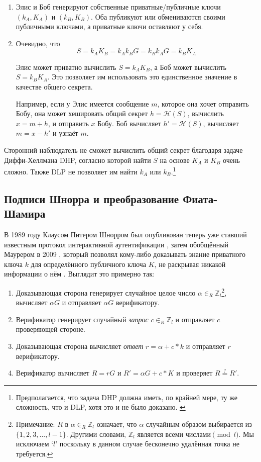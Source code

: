 \begin{enumerate}
	\item Элис и Боб генерируют собственные приватные/публичные ключи \((k_A, K_A) \textrm{ и } (k_B, K_B)\). Оба публикуют или обмениваются своими публичными ключами, а приватные ключи оставляют у себя.

	\item Очевидно, что \[S = k_A K_B = k_A k_B G = k_B k_A G = k_B K_A\]

	Элис может приватно вычислить \(S = k_A K_B\), а Боб может вычислить \(S = k_B K_A\). Это позволяет им использовать это единственное значение в качестве общего секрета.

	Например, если у Элис имеется сообщение $m$, которое она хочет отправить Бобу, она может хешировать общий секрет \(h = \mathcal{H}(S)\), вычислить $x = m + h$, и отправить  $x$ Бобу. Боб вычисляет $h' = \mathcal{H}(S)$, вычисляет $m = x - h'$ и узнаёт $m$.
\end{enumerate}   

Сторонний наблюдатель не сможет вычислить общий секрет благодаря задаче Диффи-Хел\-лмана DHP, согласно которой найти $S$ на основе $K_A$ и $K_B$ очень сложно. Также DLP не позволяет им найти $k_A$ или $k_B$.\footnote{Предполагается, что задача DHP должна иметь, по крайней мере, ту же сложность, что и DLP, хотя это и не было доказано. \cite{diffie-hellman-problem}}


\subsection{Подписи Шнорра и преобразование Фиата-Шамира}
\label{sec:schnorr-fiat-shamir}

В 1989 году Клаусом Питером Шнорром был опубликован теперь уже ставший известным протокол интерактивной аутентификации \cite{schnorr-signatures}, затем обобщённый Маурером в 2009 \cite{simple-zk-proof-maurer}, который позволял кому-либо доказывать знание приватного ключа $k$ для определённого публичного ключа $K$, не раскрывая никакой информации о нём \cite{Signatures2015BorromeanRS}. Выглядит это примерно так:

\begin{enumerate}
	\item Доказывающая сторона генерирует случайное целое число \(\alpha \in_R \mathbb{Z}_l\)\footnote{\label{notation3_note}Примечание: $R$ в \(\alpha \in_R \mathbb{Z}_l\) означает, что $\alpha$ случайным образом выбирается из \(\{1,2,3,...,l-1\}\). Другими словами, $\mathbb{Z}_l$ является всеми числами$\pmod l$. Мы исключаем `$l$' поскольку в данном случае бесконечно удалённая точка не требуется.}, вычисляет $\alpha G$ и отправляет $\alpha G$ верификатору.
	\item Верификатор генерирует случайный {\em запрос} $c \in_R \mathbb{Z}_l$ и отправляет $c$ проверяющей стороне.
	\item Доказывающая сторона вычисляет {\em ответ} $r = \alpha + c*k$ и отправляет $r$ верификатору.
	\item Верификатор вычисляет $R = r G$ и $R' = \alpha G + c*K$ и проверяет $R \stackrel{?}{=} R'$.
\end{enumerate}

